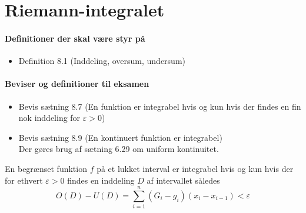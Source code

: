\chapter{Riemann-integralet}
\subsubsection{Definitioner der skal være styr på}
\begin{itemize}
\setlength\itemsep{0em}
\item Definition 8.1 (Inddeling, oversum, undersum)
\end{itemize}
\subsubsection{Beviser og definitioner til eksamen}
\begin{itemize}
\setlength\itemsep{0em}
\item Bevis sætning 8.7 (En funktion er integrabel hvis og kun hvis der findes en fin nok inddeling for $\varepsilon>0$)
\item Bevis sætning 8.9 (En kontinuert funktion er integrabel)\\
Der gøres brug af sætning 6.29 om uniform kontinuitet.
\end{itemize}
\clearpage
\begin{theorem}
En begrænset funktion $f$ på et lukket interval er integrabel hvis og kun hvis der for ethvert $\varepsilon >0$ findes en inddeling $D$ af intervallet således
\begin{equation}
O(D)-U(D)=\sum_{i=1}^n(G_i-g_i)(x_i-x_{i-1})<\varepsilon
\end{equation}
\end{theorem}
